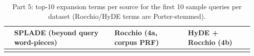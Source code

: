 \begin{small}\begin{longtable}{p{}p{}p{}p{}}\toprule
 & SPLADE (beyond query word-pieces) & Rocchio (4a, corpus PRF) & HyDE + Rocchio (4b) \\ \midrule\endhead

\bottomrule\caption{Part 5: top-10 expansion terms per source for the first 10 sample queries per dataset (Rocchio/HyDE terms are Porter-stemmed).}\label{tab:p5terms}\end{longtable}\end{small}
